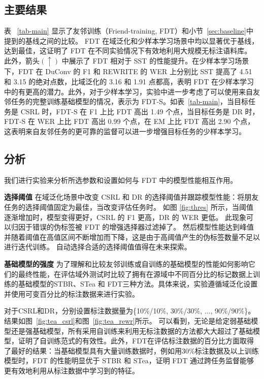 \subsection{主要结果}
表 ~\ref{tab-main} 显示了友邻训练（Friend-training, FDT）和小节~\ref{sec:baseline}中提到的基线之间的比较。 FDT 在域泛化和少样本学习场景中均以显著优于基线，达到最佳，这证明了 FDT 在不同实验情况下有效地利用大规模无标注语料库。 此外，箭头$(\uparrow)$ 中展示了 FDT 相对于 SST 的性能提升。在少样本学习场景下，FDT 在 DuConv 的 F1 和 REWRITE 的 WER 上分别比 SST 提高了 4.51 和 3.15 的绝对点数，比域泛化的 3.16 和 1.91 点都高，表明 FDT 在少样本学习中的有更高的潜力。此外，对于少样本学习，实验中进一步考虑了可以使用来自友邻任务的完整训练基础模型的情况，表示为 FDT-S。如表~\ref{tab-main}，当目标任务是 CSRL 时，FDT-S 在 F1 上比 FDT 高出 1.49 个点，当目标任务是 DR 时，FDT-S 在 WER 上比 FDT 高出 0.99 个点，在 EM 上比 FDT 高出 2.90 个点，这表明来自友邻任务的更可靠的监督可以进一步增强目标任务的少样本学习。


\subsection{分析}\label{sec:abl}
我们进行实验来分析所选参数和设置如何与 FDT 中的模型性能相互作用。

\noindent\textbf{选择阈值 } 在域泛化场景中改变 CSRL 和 DR 的选择阈值并跟踪模型性能：将朋友任务的选择阈值固定为最佳，当改变评估任务时。 如图 \ref{fig:thres} 所示，当阈值逐渐增加时，模型变得更好，CSRL 的 F1 更高，DR 的 WER 更低。 此现象可以归因于错误的伪标签被 FDT 的增强选择器过滤掉了。 然后模型性能达到峰值并随着阈值在高值区间不断增加而下降，这是由于高阈值产生的伪标签数量不足以进行迭代训练。 自动选择合适的选择阈值值得在未来探索。

\noindent\textbf{基础模型的强度 } 为了理解和比较友邻训练或自训练的基础模型的性能如何影响它们的最终性能，在评估域外测试时比较了拥有在源域中不同百分比的标记数据上训练的基础模型的STBR、STea 和 FDT三种方法。具体来说，实验遵循域泛化设置并使用可变百分比的标注数据来进行实验。

对于CSRL和DR，分别设置标注数据量为\{10\%/10\%, 30\%/30\%, ..., 90\%/90\%\}。结果如图~\ref{fig:tea_csrl}和图~\ref{fig:tea_rewr}所示。 可以看到，无论是给定弱基础模型还是强基础模型，所有采用自训练来利用无标注数据的方法都大大超过了基础模型，证明了自训练范式的有效性。此外，FDT在评估标注数据的百分比方面取得了最好的结果：当基础模型具有大量训练数据时，例如用30\%标注数据及以上训练模型时，FDT 的性能明显优于 STBR 和 STea，证明 FDT 通过跨任务监督能够更有效地利用从标注数据中学习到的特征。


